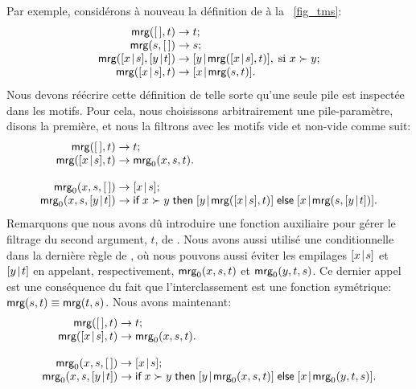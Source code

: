 Par exemple, considérons à nouveau la définition de  à la
\fig~\vref{fig_tms}:
\begin{equation*}
\begin{array}{@{}r@{\;}l@{\;}l@{}}
\fun{mrg}(\el,t)         & \rightarrow & t;\\
\fun{mrg}(s,\el)         & \rightarrow & s;\\
\fun{mrg}(\cons{x}{s},\cons{y}{t}) & \rightarrow
                         & \cons{y}{\fun{mrg}(\cons{x}{s},t)},\;
                           \text{si \(x \succ y\)};\\
\fun{mrg}(\cons{x}{s},t) & \rightarrow & \cons{x}{\fun{mrg}(s,t)}.
\end{array}
\end{equation*}
Nous devons réécrire cette définition de telle sorte qu'une seule pile
est inspectée dans les motifs. Pour cela, nous choisissons
arbitrairement une pile-paramètre, disons la première, et nous la
filtrons avec les motifs vide et non-vide comme suit:
\begin{equation*}
\begin{array}{@{}r@{\;}l@{\;}l@{}}
\fun{mrg}(\el,t)         & \rightarrow & t;\\
\fun{mrg}(\cons{x}{s},t) & \rightarrow & \fun{mrg}_0(x,s,t).\\
\\
\fun{mrg}_0(x,s,\el)     & \rightarrow & \cons{x}{s};\\
\fun{mrg}_0(x,s,\cons{y}{t}) & \rightarrow
& \fun{if} \; x \succ y \; \fun{then} \;
  \cons{y}{\fun{mrg}(\cons{x}{s},t)} \;
  \fun{else} \; \cons{x}{\fun{mrg}(s,\cons{y}{t})}.
\end{array}
\end{equation*}
Remarquons que nous avons dû introduire une fonction auxiliaire
 pour gérer le filtrage du second argument, \(t\), de
. Nous avons aussi utilisé une conditionnelle dans la
dernière règle de , où nous pouvons aussi éviter les
empilages \([{x}\!\mid\!{s}]\) et \([{y}\!\mid\!{t}]\) en appelant,
respectivement, \(\textsf{mrg}_0(x,s,t)\) et \(\textsf{mrg}_0(y,t,s)\). Ce
dernier appel est une conséquence du fait que l'interclassement est
une fonction symétrique: \(\textsf{mrg}(s,t) \equiv
\textsf{mrg}(t,s)\). Nous avons maintenant:
\begin{equation*}
\begin{array}{@{}r@{\;}l@{\;}l@{}}
\fun{mrg}(\el,t)         & \rightarrow & t;\\
\fun{mrg}(\cons{x}{s},t) & \rightarrow & \fun{mrg}_0(x,s,t).\\
\\
\fun{mrg}_0(x,s,\el)     & \rightarrow & \cons{x}{s};\\
\fun{mrg}_0(x,s,\cons{y}{t}) & \rightarrow
& \fun{if} \; x \succ y \; \fun{then} \;
  \cons{y}{\fun{mrg}_0(x,s,t)} \;
  \fun{else} \; \cons{x}{\fun{mrg}_0(y,t,s)}.
\end{array}
\end{equation*}
